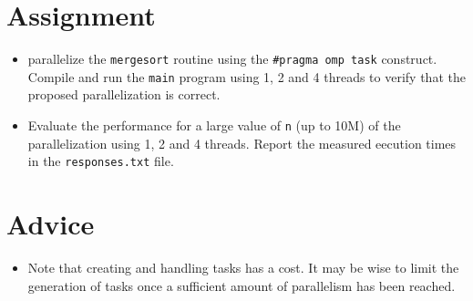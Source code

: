 \documentclass{article}
\begin{document}
\section{Assignment}
\begin{itemize}
\item {\huge \Keyboard} parallelize the \texttt{mergesort} routine
  using the \texttt{\#pragma omp task} construct. Compile and run the
  \texttt{main} program using 1, 2 and 4 threads to verify that the
  proposed parallelization is correct. 
\item \smallpencil Evaluate the performance for a large value of
  \texttt{n} (up to 10M) of the parallelization
  using 1, 2 and 4 threads. Report the measured eecution times in the
  \texttt{responses.txt} file.
\end{itemize}


\section{Advice}
\begin{itemize}
\item Note that creating and handling tasks has a cost. It may be wise
  to limit the generation of tasks once a sufficient amount of
  parallelism has been reached.
\end{itemize}
\end{document}
